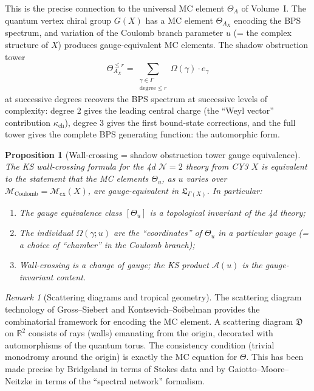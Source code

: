 \documentclass[11pt]{article}
\newtheorem{proposition}[theorem]{Proposition}
\theoremstyle{definition}
\theoremstyle{remark}
\newtheorem{remark}[theorem]{Remark}
\newcommand{\cM}{\mathcal{M}}
\newcommand{\cN}{\mathcal{N}}
\newcommand{\Coulomb}{\mathrm{Coulomb}}
\begin{document}
This is the precise connection to the universal MC element $\Theta_A$ of Volume~I. The quantum
vertex chiral group $G(X)$ has a MC element $\Theta_{A_X}$ encoding the BPS spectrum, and variation
of the Coulomb branch parameter $u$ (= the complex structure of $X$) produces gauge-equivalent MC
elements. The shadow obstruction tower
\begin{equation}
 \label{eq:shadow-tower-bps}
 \Theta_{A_X}^{\leq r} = \sum_{\substack{\gamma \in \Gamma \\ \text{degree} \leq r}} \Omega(\gamma) \cdot e_\gamma
\end{equation}
at successive degrees recovers the BPS spectrum at successive levels of complexity: degree 2 gives
the leading central charge (the ``Weyl vector'' contribution $\kappa_{\mathrm{ch}}$), degree 3 gives the first
bound-state corrections, and the full tower gives the complete BPS generating function: the
automorphic form.

\begin{proposition}[Wall-crossing = shadow obstruction tower gauge equivalence]
 \label{prop:wc-shadow}
 The KS wall-crossing formula for the 4d $\cN=2$ theory from CY3 $X$ is equivalent to the
 statement that the MC elements $\Theta_u$, as $u$ varies over $\cM_{\Coulomb} = \cM_{\mathrm{cx}}(X)$,
 are gauge-equivalent in $\mathfrak{L}_{\Gamma(X)}$. In particular:
 \begin{enumerate}[label=(\roman*),nosep]
 \item The gauge equivalence class $[\Theta_u]$ is a topological invariant of the 4d theory;
 \item The individual $\Omega(\gamma; u)$ are the ``coordinates'' of $\Theta_u$ in a particular
 gauge (= a choice of ``chamber'' in the Coulomb branch);
 \item Wall-crossing is a change of gauge; the KS product $\mathcal{A}(u)$ is the gauge-invariant
 content.
 \end{enumerate}
\end{proposition}

\begin{remark}[Scattering diagrams and tropical geometry]
 \label{rem:scattering-diagrams}
 The scattering diagram technology of Gross--Siebert and Kontsevich--Soibelman provides the
 combinatorial framework for encoding the MC element. A scattering diagram $\mathfrak{D}$ on
 $\mathbb{R}^2$ consists of rays (walls) emanating from the origin, decorated with automorphisms
 of the quantum torus. The consistency condition (trivial monodromy around the origin) is exactly
 the MC equation for $\Theta$. This has been made precise by Bridgeland in terms of Stokes data
 and by Gaiotto--Moore--Neitzke in terms of the ``spectral network'' formalism.
\end{remark}
\end{document}
